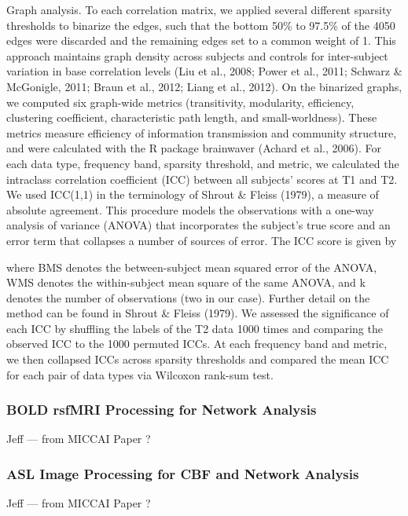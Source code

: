 Graph analysis. To each correlation matrix, we applied several different sparsity thresholds to binarize the edges, such that the bottom 50\% to 97.5\% of the 4050 edges were discarded and the remaining edges set to a common weight of 1. This approach maintains graph density across subjects and controls for inter-subject variation in base correlation levels (Liu et al., 2008; Power et al., 2011; Schwarz \& McGonigle, 2011; Braun et al., 2012; Liang et al., 2012).  On the binarized graphs, we computed six graph-wide metrics (transitivity, modularity, efficiency, clustering coefficient, characteristic path length, and small-worldness). These metrics measure efficiency of information transmission and community structure, and were calculated with the R package brainwaver (Achard et al., 2006). For each data type, frequency band, sparsity threshold, and metric, we calculated the intraclass correlation coefficient (ICC) between all subjects’ scores at T1 and T2. We used ICC(1,1) in the terminology of Shrout \& Fleiss (1979), a measure of absolute agreement. This procedure models the observations with a one-way analysis of variance (ANOVA) that incorporates the subject’s true score and an error term that collapses a number of sources of error. The ICC score is given by


 
where BMS denotes the between-subject mean squared error of the ANOVA, WMS denotes the within-subject mean square of the same ANOVA, and k denotes the number of observations (two in our case). Further detail on the method can be found in Shrout \& Fleiss (1979). We assessed the significance of each ICC by shuffling the labels of the T2 data 1000 times and comparing the observed ICC to the 1000 permuted ICCs. At each frequency band and metric, we then collapsed ICCs across sparsity thresholds and compared the mean ICC for each pair of data types via Wilcoxon rank-sum test. 

\subsubsection{BOLD rsfMRI Processing for Network Analysis}

Jeff --- from MICCAI Paper ?

\subsubsection{ASL Image Processing for CBF and Network Analysis}

Jeff --- from MICCAI Paper ?

